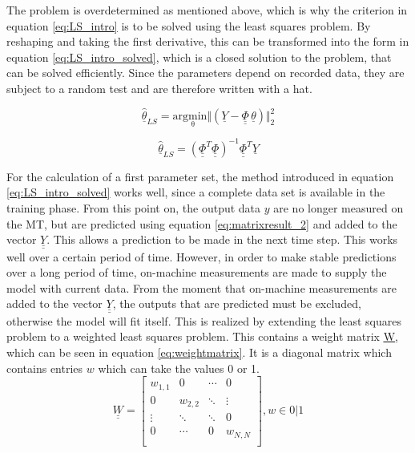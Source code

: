 The problem is overdetermined as mentioned above, which is why the criterion in equation \ref{eq:LS_intro} is to be solved using the least squares problem. By reshaping and taking the first derivative, this can be transformed  into the form in equation \ref{eq:LS_intro_solved}, which is a closed solution to the problem, that can be solved efficiently. Since the parameters depend on recorded data, they are subject to a random test and are therefore written with a hat.

 \begin{equation}
			\hat{\underline{\theta}}_{LS} = \mathrm{arg \underset{\theta} min} \Vert (\underline{Y}-\underline{\underline{\Phi}} \, \underline{\theta}) \Vert^2_2 	
	\label{eq:LS_intro}
\end{equation}

 \begin{equation}
			\hat{\underline{\theta}}_{LS} = (\underline{\underline{\Phi}}^T\underline{\underline{\Phi}})^{-1}\underline{\underline{\Phi}}^T\underline{Y}	
	\label{eq:LS_intro_solved}
\end{equation}

For the calculation of a first parameter set, the method introduced in equation \ref{eq:LS_intro_solved} works well, since a complete data set is available in the training phase. From this point on, the output data $y$ are no longer measured on the MT, but are predicted using equation \ref{eq:matrixresult_2} and added to the vector $\underline{\underline{Y}}$. This allows a prediction to be made in the next time step. This works well over a certain period of time. However, in order to make stable predictions over a long period of time, on-machine measurements are made to supply the model with current data. From the moment that on-machine measurements are added to the vector $\underline{\underline{Y}}$, the outputs that are predicted must be excluded, otherwise the model will fit itself. This is realized by extending the least squares problem to a weighted least squares problem. This contains a weight matrix \underline{\underline{W}}, which can be seen in equation \ref{eq:weightmatrix}. It is a diagonal matrix which contains entries $w$ which can take the values 0 or 1. 
 \begin{equation}
			\underline{\underline{W}}  =  \begin{bmatrix}
		w_{1,1} & 0 & \cdots & 0 \\
		0 & w_{2,2} & \ddots & \vdots \\
		\vdots & \ddots & \ddots & 0 \\
		0 & \cdots & 0 & w_{N,N} \\
				\end{bmatrix},
				w \in {0|1}
	\label{eq:weightmatrix}
\end{equation}

